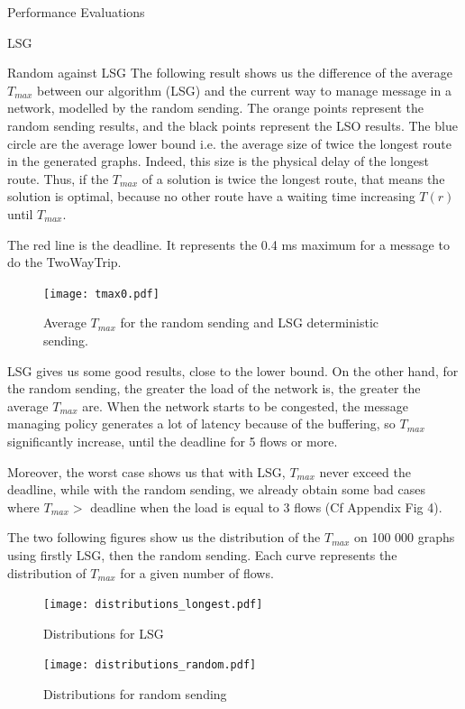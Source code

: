 \documentclass[a4paper,10pt]{report}
\begin{document}
\begin{chapter}{Performance Evaluations}
\begin{section}{LSG}
\begin{subsection}{Random against LSG}
The following result shows us the difference of the average $T_{max}$ between our algorithm (LSG) and the current way to manage message in a network, modelled by the random sending.
The orange points represent the random sending results, and the black points represent the LSO results.
The blue circle are the average lower bound i.e. the average size of twice the longest route in the generated graphs.
Indeed, this size is the physical delay of the longest route.
Thus, if the $T_{max}$ of a solution is twice the longest route, that means the solution is optimal, because no other route have a waiting time increasing $T(r)$ until $T_{max}$.

The red line is the deadline. It represents the 0.4 ms maximum for a message to do the TwoWayTrip.

\begin{figure}[H]
\hspace*{-3cm}
\centering
\texttt{[image: tmax0.pdf]}%
\caption{Average $T_{max}$ for the random sending and LSG deterministic sending.}
\end{figure}

LSG gives us some good results, close to the lower bound. On the other hand, for the random sending, 
the greater the load of the network is, the greater the average $T_{max}$ are. When the network starts to be congested, the 
message managing policy generates a lot of latency because of the buffering, so $T_{max}$ significantly increase, until the deadline for 5 flows or more.


Moreover, the worst case shows us that with LSG, $T_{max}$ never exceed the deadline, while with the random sending, we already obtain some bad cases where $T_{max} > $ deadline when the load is equal to 3 flows (Cf Appendix Fig 4).


The two following figures show us the distribution of the $T_{max}$ on 100 000 graphs using firstly LSG, then the
random sending.
Each curve represents the distribution of $T_{max}$ for a given number of flows.
\begin{figure}[H]
\hspace*{-4cm}
\centering
\texttt{[image: distributions\_longest.pdf]}%
\caption{Distributions for LSG}
\end{figure}

\begin{figure}[H]
\hspace*{-3cm}
\centering
\texttt{[image: distributions\_random.pdf]}%
\caption{Distributions for random sending}
\end{figure}


\end{subsection}
\end{section}
\end{chapter}
\end{document}
